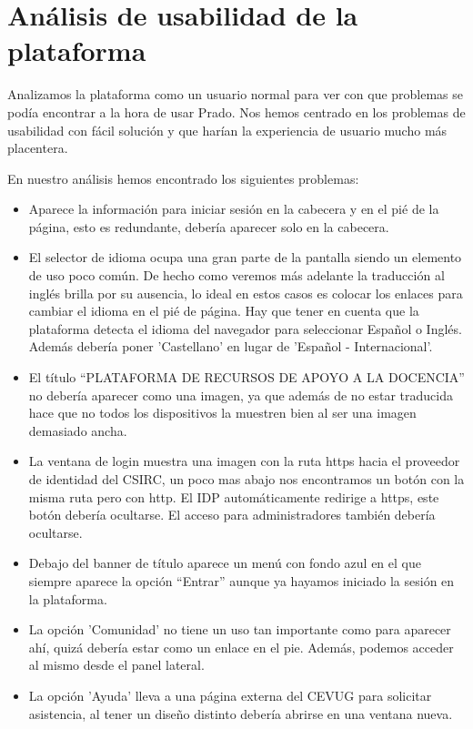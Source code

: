 \section{Análisis de usabilidad de la plataforma}

Analizamos la plataforma como un usuario normal para ver con que problemas se podía encontrar a la hora de usar Prado. Nos hemos centrado en los problemas de usabilidad con fácil solución y que harían la experiencia de usuario mucho más placentera.

\bigskip
En nuestro análisis hemos encontrado los siguientes problemas:

\begin{itemize}

\item Aparece la información para iniciar sesión en la cabecera y en el pié de la página, esto es redundante, debería aparecer solo en la cabecera.
\item El selector de idioma ocupa una gran parte de la pantalla siendo un elemento de uso poco común. De hecho como veremos más adelante la traducción al inglés brilla por su ausencia, lo ideal en estos casos es colocar los enlaces para cambiar el idioma en el pié de página. Hay que tener en cuenta que la plataforma detecta el idioma del navegador para seleccionar Español o Inglés. Además debería poner 'Castellano' en lugar de 'Español - Internacional'.
\item El título ``PLATAFORMA DE RECURSOS DE APOYO A LA DOCENCIA'' no debería aparecer como una imagen, ya que además de no estar traducida hace que no todos los dispositivos la muestren bien al ser una imagen demasiado ancha.
\item La ventana de login muestra una imagen con la ruta https hacia el proveedor de identidad del CSIRC, un poco mas abajo nos encontramos un botón con la misma ruta pero con http. El IDP automáticamente redirige a https, este botón debería ocultarse. El acceso para administradores también debería ocultarse.
\item Debajo del banner de título aparece un menú con fondo azul en el que siempre aparece la opción ``Entrar'' aunque ya hayamos iniciado la sesión en la plataforma.
\item La opción 'Comunidad' no tiene un uso tan importante como para aparecer ahí, quizá debería estar como un enlace en el pie. Además, podemos acceder al mismo desde el panel lateral.
\item La opción 'Ayuda' lleva a una página externa del CEVUG para solicitar asistencia, al tener un diseño distinto debería abrirse en una ventana nueva.

\end{itemize}
